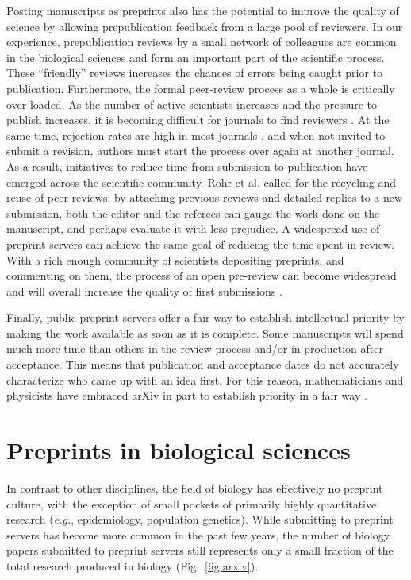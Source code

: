 \documentclass[10pt]{article}
\begin{document}
Posting manuscripts as preprints also has the potential to improve the 
quality of science by allowing prepublication feedback from a large pool of 
reviewers. In our experience, prepublication reviews by a small network of 
colleagues are common in the biological sciences and form an important part 
of the scientific process. These ``friendly'' reviews increases the chances 
of errors being caught prior to publication. Furthermore, the formal 
peer-review process as a whole is critically over-loaded. As the number of 
active scientists increases and the pressure to publish increases, it is 
becoming difficult for journals to find reviewers \cite{hoc09}.  At the same 
time, rejection rates are high in most journals \cite{aar08,roh09}, and when 
not invited to submit a revision, authors must start the process over again 
at another journal. As a result, initiatives to reduce time from submission 
to publication have emerged across the scientific community. Rohr et al.  
\cite{roh09} called for the recycling and reuse of peer-reviews: by 
attaching previous reviews and detailed replies to a new submission, both 
the editor and the referees can gauge the work done on the manuscript, and 
perhaps evaluate it with less prejudice. A widespread use of preprint 
servers can achieve the same goal of reducing the time spent in review. With 
a rich enough community of scientists depositing preprints, and commenting 
on them, the process of an open pre-review can become widespread and will 
overall increase the quality of first submissions \cite{hoc12}.

Finally, public preprint servers offer a fair way to establish intellectual
priority by making the work available as soon as it is complete. Some
manuscripts will spend much more time than others in the review process and/or in
production after acceptance. This means that publication and
acceptance dates do not accurately characterize who came up with an idea
first. For this reason, mathematicians and physicists have embraced arXiv in
part to establish priority in a fair way \cite{gin11,cal12}.

\section*{Preprints in biological sciences}

In contrast to other disciplines, the field of biology has effectively no
preprint culture, with the exception of small pockets of primarily highly
quantitative research (\emph{e.g.}, epidemiology, population genetics).  While
submitting to preprint servers has become more common in the past few years, the
number of biology papers submitted to preprint servers still represents only a
small fraction of the total research produced in biology (Fig.~\ref{fig:arxiv}).
\end{document}

